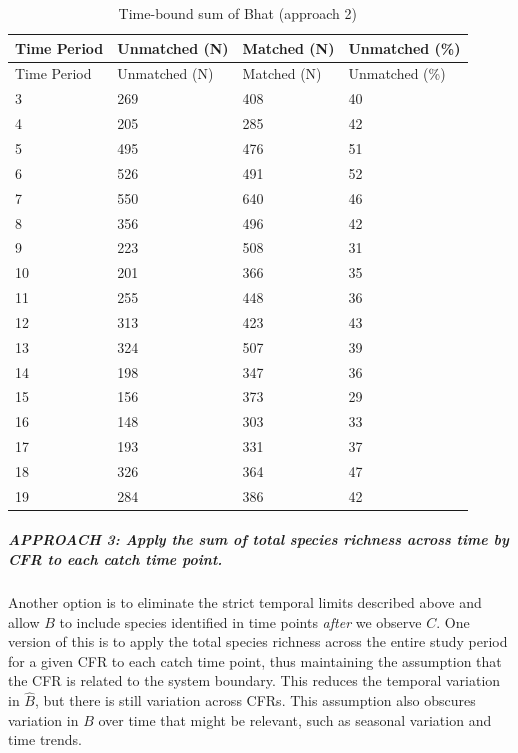 \documentclass[
]{article}
\begin{document}
\begin{longtable}[]{@{}llll@{}}
\caption{Time-bound sum of Bhat (approach 2)}\tabularnewline
\toprule
Time Period & Unmatched (N) & Matched (N) & Unmatched (\%) \\
\midrule
\endfirsthead
\toprule
Time Period & Unmatched (N) & Matched (N) & Unmatched (\%) \\
\midrule
\endhead
3 & 269 & 408 & 40 \\
4 & 205 & 285 & 42 \\
5 & 495 & 476 & 51 \\
6 & 526 & 491 & 52 \\
7 & 550 & 640 & 46 \\
8 & 356 & 496 & 42 \\
9 & 223 & 508 & 31 \\
10 & 201 & 366 & 35 \\
11 & 255 & 448 & 36 \\
12 & 313 & 423 & 43 \\
13 & 324 & 507 & 39 \\
14 & 198 & 347 & 36 \\
15 & 156 & 373 & 29 \\
16 & 148 & 303 & 33 \\
17 & 193 & 331 & 37 \\
18 & 326 & 364 & 47 \\
19 & 284 & 386 & 42 \\
\bottomrule
\end{longtable}

\hfill\break
\hfill\break

\hypertarget{approach-3-apply-the-sum-of-total-species-richness-across-time-by-cfr-to-each-catch-time-point.}{%
\subparagraph{\texorpdfstring{\textbf{APPROACH 3: Apply the sum of total
species richness across time by CFR to each catch time
point.}}{APPROACH 3: Apply the sum of total species richness across time by CFR to each catch time point.}}\label{approach-3-apply-the-sum-of-total-species-richness-across-time-by-cfr-to-each-catch-time-point.}}

\hfill\break
\hfill\break
Another option is to eliminate the strict temporal limits described
above and allow \(B\) to include species identified in time points
\emph{after} we observe \(C\). One version of this is to apply the total
species richness across the entire study period for a given CFR to each
catch time point, thus maintaining the assumption that the CFR is
related to the system boundary. This reduces the temporal variation in
\(\hat{B}\), but there is still variation across CFRs. This assumption
also obscures variation in \(B\) over time that might be relevant, such
as seasonal variation and time trends.
\end{document}
